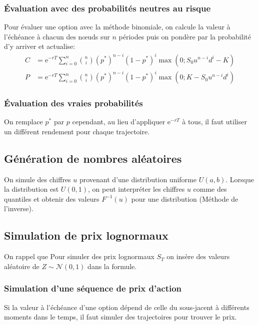 \documentclass[10pt, french]{article}
\begin{document}
\begin{multicols*}{2}
\subsubsection*{Évaluation avec des probabilités neutres au risque}
Pour évaluer une option avec la méthode binomiale, on calcule la valeur à l'échéance à chacun des nœuds sur $n$ périodes puis on pondère par la probabilité d'y arriver et actualise:
\begin{align*}
	C
	&=	\textrm{e}^{-rT} \sum_{i	=	0}^{n} \binom{n}{i} (p^{*})^{n	-	i}(1	-	p^{*})^{i} \max(0;	S_{0}u^{n	-	i}d^{i}	-	K)	\\
	P
	&=	\textrm{e}^{-rT} \sum_{i	=	0}^{n} \binom{n}{i} (p^{*})^{n	-	i}(1	-	p^{*})^{i} \max(0;	K	-	S_{0}u^{n	-	i}d^{i})	
\end{align*}

\subsubsection*{Évaluation des vraies probabilités}
On remplace $p^{*}$ par $p$ cependant, au lieu d'appliquer $\textrm{e}^{-rT}$ à tous, il faut utiliser un différent rendement pour chaque trajectoire.


\columnbreak
\subsection{Génération de nombres aléatoires}
On simule des chiffres $u$ provenant d'une distribution uniforme $U(a, b)$. Lorsque la distribution est $U(0, 1)$, on peut interpréter les chiffres $u$ comme des quantiles et obtenir des valeurs $F^{-1}(u)$ pour une distribution (Méthode de l'inverse).

\subsection{Simulation de prix lognormaux}
On rappel que 
Pour simuler des prix lognormaux $S_{T}$ on insère des valeurs aléatoire de $Z \sim \mathcal{N}(0, 1)$ dans la formule.

\subsubsection*{Simulation d'une séquence de prix d'action}
Si la valeur à l'échéance d'une option dépend de celle du sous-jacent à différents moments dans le temps, il faut simuler des trajectoires pour trouver le prix.\\


\end{multicols*}
\end{document}
